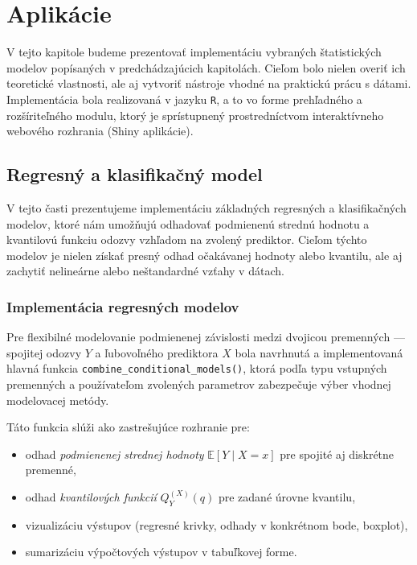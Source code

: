 \chapter{Aplikácie}\label{sec:applications}

V tejto kapitole budeme prezentovať implementáciu vybraných štatistických modelov popísaných v predchádzajúcich kapitolách. Cieľom bolo nielen overiť ich teoretické vlastnosti, ale aj vytvoriť nástroje vhodné na praktickú prácu s dátami. Implementácia bola realizovaná v jazyku \texttt{R}, a to vo forme prehľadného a rozšíriteľného modulu, ktorý je sprístupnený prostredníctvom interaktívneho webového rozhrania (Shiny aplikácie).

\section{Regresný a klasifikačný model}

V tejto časti prezentujeme implementáciu základných regresných a klasifikačných modelov, ktoré nám umožňujú odhadovať podmienenú strednú hodnotu a kvantilovú funkciu odozvy vzhľadom na zvolený prediktor. Cieľom týchto modelov je nielen získať presný odhad očakávanej hodnoty alebo kvantilu, ale aj zachytiť nelineárne alebo neštandardné vzťahy v dátach.

\subsection{Implementácia regresných modelov}\label{subsec:regression_implementation}

Pre flexibilné modelovanie podmienenej závislosti medzi dvojicou premenných — spojitej odozvy $Y$ a ľubovoľného prediktora $X$ bola navrhnutá a implementovaná hlavná funkcia \texttt{combine\_conditional\_models()}, ktorá podľa typu vstupných premenných a používateľom zvolených parametrov zabezpečuje výber vhodnej modelovacej metódy.

Táto funkcia slúži ako zastrešujúce rozhranie pre:
\begin{itemize}
  \item odhad \textit{podmienenej strednej hodnoty} $\mathbb{E}[Y \mid X = x]$ pre spojité aj diskrétne premenné,
  \item odhad \textit{kvantilových funkcií} $Q_Y^{(X)}(q)$ pre zadané úrovne kvantilu,
  \item vizualizáciu výstupov (regresné krivky, odhady v konkrétnom bode, boxplot),
  \item sumarizáciu výpočtových výstupov v tabuľkovej forme.
\end{itemize}

